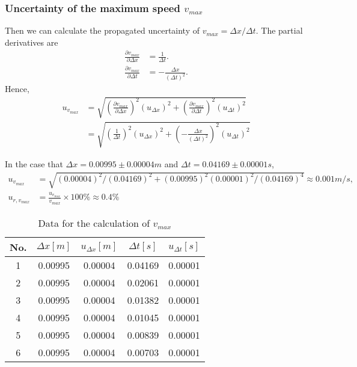 \subsubsection{Uncertainty of the maximum speed $v_{max}$}
    Then we can calculate the propagated uncertainty of $v_{max}=\Delta x/\Delta t$. The partial derivatives are
    \[
    \begin{split}
        \frac{\partial v_{max}}{\partial \Delta x}&=\frac{1}{\Delta t}.\\[0.5cm]
        \frac{\partial v_{max}}{\partial \Delta t}&=-\frac{\Delta x}{(\Delta t)^2}.    
    \end{split}    
    \]
    Hence,
    \[
    \begin{split}
        u_{v_{max}}&=\sqrt{(\frac{\partial v_{max}}{\partial \Delta x})^2(u_{\Delta x})^2+(\frac{\partial v_{max}}{\partial \Delta t})^2(u_{\Delta t})^2}\\[0.4cm]
        &=\sqrt{(\frac{1}{\Delta t})^2(u_{\Delta x})^2+(-\frac{\Delta x}{(\Delta t)^2})^2(u_{\Delta t})^2}
    \end{split}
    \]

    In the case that $\Delta x=0.00995\pm 0.00004m$ and $\Delta t=0.04169\pm 0.00001s$,
    \[
    \begin{split}
        u_{v_{max}}&=\sqrt{(0.00004)^2/(0.04169)^2+(0.00995)^2(0.00001)^2/(0.04169)^4}\approx0.001m/s,\\
        u_{r,v_{max}}&=\frac{u_{v_{max}}}{v_{max}}\times100\%\approx0.4\%
    \end{split}
    \]
    \begin{table}[!h] \small
        \centering
        \begin{tabular}{|c|c|c|c|c|}
            \hline
            No. & $\Delta x[m]$ & $u_{\Delta x}[m]$ & $\Delta t[s]$ & $u_{\Delta t}[s]$\\ \hline
            1 & 0.00995 & 0.00004 & 0.04169 & 0.00001\\ \hline
            2 & 0.00995 & 0.00004 & 0.02061 & 0.00001\\ \hline
            3 & 0.00995 & 0.00004 & 0.01382 & 0.00001\\ \hline
            4 & 0.00995 & 0.00004 & 0.01045 & 0.00001\\ \hline
            5 & 0.00995 & 0.00004 & 0.00839 & 0.00001\\ \hline
            6 & 0.00995 & 0.00004 & 0.00703 & 0.00001\\ \hline
        \end{tabular}
        \caption{Data for the calculation of $v_{max}$}\label{dt}
    \end{table}

